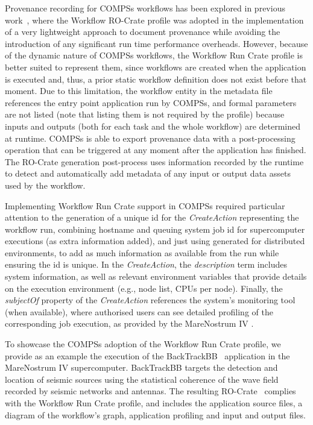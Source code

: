 Provenance recording for COMPSs workflows has been explored in previous work~\cite{Sirvent 2022}, where the Workflow RO-Crate profile was adopted in the implementation of a very lightweight approach to document provenance while avoiding the introduction of any significant run time performance overheads.
However, because of the dynamic nature of COMPSs workflows, the Workflow Run Crate profile is better suited to represent them, since workflows are created when the application is executed and, thus, a prior static workflow definition does not exist before that moment.
Due to this limitation, the workflow entity in the metadata file references the entry point application run by COMPSs, and formal parameters are not listed (note that listing them is not required by the profile) because inputs and outputs (both for each task and the whole workflow) are determined at runtime.
COMPSs is able to export provenance data with a post-processing operation that can be triggered at any moment after the application has finished.
The RO-Crate generation post-process uses information recorded by the runtime to detect and automatically add metadata of any input or output data assets used by the workflow.

Implementing Workflow Run Crate support in COMPSs required particular attention to the generation of a unique id for the \emph{CreateAction} representing the workflow run, combining hostname and queuing system job id for supercomputer executions (as extra information added), and just using generated  for distributed environments, to add as much information as available from the run while ensuring the id is unique.
In the \emph{CreateAction}, the \emph{description} term includes system information, as well as relevant environment variables that provide details on the execution environment (e.g., node list, CPUs per node).
Finally, the \emph{subjectOf} property of the \emph{CreateAction} references the system’s monitoring tool (when available),
where authorised users can see detailed profiling of the corresponding job execution, as provided by the MareNostrum IV .

To showcase the COMPSs adoption of the Workflow Run Crate profile, we provide as an example the execution of the BackTrackBB~\cite{Poiata 2016}
application in the MareNostrum IV supercomputer.
BackTrackBB targets the detection and location of seismic sources using the statistical coherence of the wave field recorded by seismic networks and antennas.
The resulting RO-Crate~\cite{Poiata 2023} complies with the Workflow Run Crate profile, and includes the application source files, a diagram of the workflow's graph, application profiling and input and output files.

